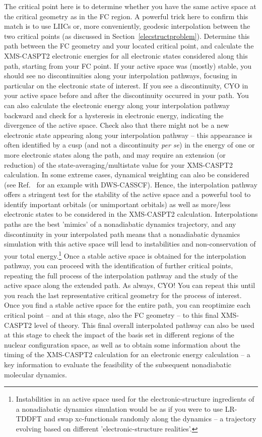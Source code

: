 \documentclass[9pt,bestpractices,pubversion]{livecoms}
\begin{document}
The critical point here is to determine whether you have the same active space at the critical geometry as in the FC region. A powerful trick here to confirm this match is to use LIICs or, more conveniently, geodesic interpolation between the two critical points (as discussed in Section~\ref{elecstructproblem}). Determine this path between the FC geometry and your located critical point, and calculate the XMS-CASPT2 electronic energies for all electronic states considered along this path, starting from your FC point. If your active space was (mostly) stable, you should see no discontinuities along your interpolation pathways, focusing in particular on the electronic state of interest. If you see a discontinuity, CYO in your active space before and after the discontinuity occurred in your path. You can also calculate the electronic energy along your interpolation pathway backward and check for a hysteresis in electronic energy, indicating the divergence of the active space. Check also that there might not be a new electronic state appearing along your interpolation pathway -- this appearance is often identified by a cusp (and not a discontinuity \textit{per se}) in the energy of one or more electronic states along the path, and may require an extension (or reduction) of the state-averaging/multistate value for your XMS-CASPT2 calculation. In some extreme cases, dynamical weighting can also be considered (see Ref.~ for an example with DWS-CASSCF). Hence, the interpolation pathway offers a stringent test for the stability of the active space and a powerful tool to identify important orbitals (or unimportant orbitals) as well as more/less electronic states to be considered in the XMS-CASPT2 calculation. Interpolations paths are the best 'mimics' of a nonadiabatic dynamics trajectory, and any discontinuity in your interpolated path means that a nonadiabatic dynamics simulation with this active space will lead to instabilities and non-conservation of your total energy.\footnote{Instabilities in an active space used for the electronic-structure ingredients of a nonadiabatic dynamics simulation would be as if you were to use LR-TDDFT and swap xc-functionals randomly along the dynamics -- a trajectory evolving based on different 'electronic-structure realities'.} Once a stable active space is obtained for the interpolation pathway, you can proceed with the identification of further critical points, repeating the full process of the interpolation pathway and the study of the active space along the extended path. As always, CYO! You can repeat this until you reach the last representative critical geometry for the process of interest. Once you find a stable active space for the entire path, you can reoptimize each critical point -- and at this stage, also the FC geometry -- to this final XMS-CASPT2 level of theory. This final overall interpolated pathway can also be used at this stage to check the impact of the basis set in different regions of the nuclear configuration space, as well as to obtain some information about the timing of the XMS-CASPT2 calculation for an electronic energy calculation -- a key information to evaluate the feasibility of the subsequent nonadiabatic molecular dynamics. 
\end{document}
